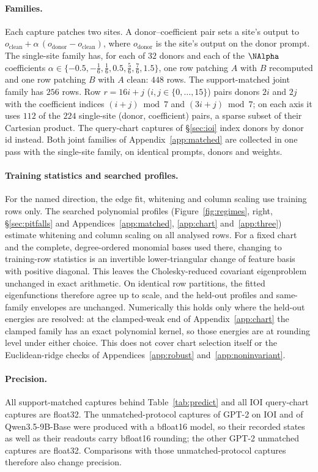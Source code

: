 \paragraph{Families.} Each capture patches two sites. A donor--coefficient pair sets a site's output to
$o_{\mathrm{clean}}+\alpha\,(o_{\mathrm{donor}}-o_{\mathrm{clean}})$, where $o_{\mathrm{donor}}$ is the site's output on
the donor prompt. The single-site family has, for each of $32$ donors and each
of the $\NAlpha$ coefficients $\alpha\in\{-0.5,-\tfrac16,\tfrac16,0.5,\tfrac56,\tfrac76,1.5\}$, one row patching $A$
with $B$ recomputed and one row patching $B$ with $A$ clean: $448$ rows. The support-matched joint family has $256$
rows. Row $r=16i+j$ ($i,j\in\{0,\dots,15\}$) pairs donors $2i$ and $2j$ with the coefficient indices $(i+j)\bmod 7$
and $(3i+j)\bmod 7$; on each axis it uses $112$ of the $224$ single-site (donor, coefficient) pairs, a sparse subset
of their Cartesian product. The query-chart captures of \S\ref{sec:ioi} index donors by donor id instead. Both joint
families of Appendix~\ref{app:matched} are collected in one pass with the single-site family, on identical prompts,
donors and weights.

\paragraph{Training statistics and searched profiles.} For the named direction, the edge fit, whitening and
column scaling use training rows only. The searched
polynomial profiles (Figure~\ref{fig:regimes}, right, \S\ref{sec:pitfalls} and Appendices~\ref{app:matched},
\ref{app:chart} and~\ref{app:three}) estimate whitening and column scaling on all analysed rows. For a fixed chart
and the complete, degree-ordered monomial bases used there, changing to training-row statistics is an invertible
lower-triangular change of feature basis with positive diagonal. This leaves the Cholesky-reduced covariant
eigenproblem unchanged in exact arithmetic. On identical row partitions, the fitted eigenfunctions therefore agree
up to scale, and the held-out profiles and same-family envelopes are unchanged. Numerically this holds only where the
held-out energies are resolved: at the clamped-weak end of Appendix~\ref{app:chart} the clamped family has an exact
polynomial kernel, so those energies are at rounding level under either choice. This does not cover chart selection
itself or the Euclidean-ridge checks of Appendices~\ref{app:robust} and~\ref{app:noninvariant}.

\paragraph{Precision.} All support-matched captures behind Table~\ref{tab:predict} and all IOI query-chart captures
are float32. The unmatched-protocol captures of GPT-2 on IOI and of Qwen3.5-9B-Base were produced with a bfloat16
model, so their recorded states as well as their readouts carry bfloat16 rounding; the other GPT-2 unmatched captures
are float32. Comparisons with those unmatched-protocol captures therefore also change precision.

